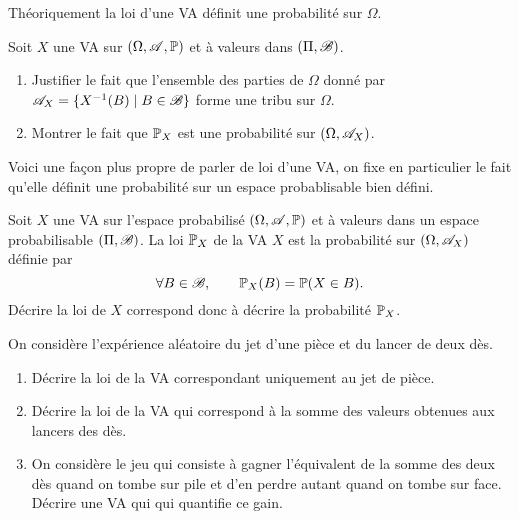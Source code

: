 \documentclass[11pt, a4paper]{article}
\begin{document}
Théoriquement la loi d'une VA définit une probabilité sur $\Omega$.
\begin{question}
  Soit $X$ une VA sur $(\Omega, \mathscr{A}, \operatorname{\mathbb{P}})$ et à valeurs dans
  $(\Pi, \mathscr{B})$.
  \begin{enumerate}
  \item Justifier le fait que l'ensemble des parties de $\Omega$ donné
    par $\mathscr{A}_X = \{X^{-1}(B) \mid B \in \mathscr{B}\}$ forme une tribu
    sur $\Omega$.
  \item Montrer le fait que $\operatorname{\mathbb{P}}_X$ est une probabilité sur
    $(\Omega, \mathscr{A}_X)$.
  \end{enumerate}
\end{question}
Voici une fa\c{c}on plus propre de parler de loi d'une VA, on fixe en
particulier le fait qu'elle définit une probabilité sur un espace
probablisable bien défini.
\begin{defn}
  Soit $X$ une VA sur l'espace probabilisé $(\Omega, \mathscr{A}, \operatorname{\mathbb{P}})$ et
  à valeurs dans un espace probabilisable $(\Pi, \mathscr{B})$. La loi
  $\operatorname{\mathbb{P}}_X$ de la VA $X$ est la probabilité sur $(\Omega, \mathscr{A}_X)$
  définie par
  \[
    \forall B \in \mathscr{B}, \qquad \operatorname{\mathbb{P}}_X(B) = \operatorname{\mathbb{P}}(X \in B).
  \]
  Décrire la loi de $X$ correspond donc à décrire la probabilité
  $\operatorname{\mathbb{P}}_X$.
\end{defn}
\begin{question}
  On considère l'expérience aléatoire du jet d'une pièce et du lancer
  de deux dès.
  \begin{enumerate}
  \item Décrire la loi de la VA correspondant uniquement au jet de
    pièce.
  \item Décrire la loi de la VA qui correspond à la somme des valeurs
    obtenues aux lancers des dès.
  \item On considère le jeu qui consiste à gagner l'équivalent de la
    somme des deux dès quand on tombe sur pile et d'en perdre autant
    quand on tombe sur face. Décrire une VA qui qui quantifie ce gain.
  \end{enumerate}
\end{question}
\end{document}
